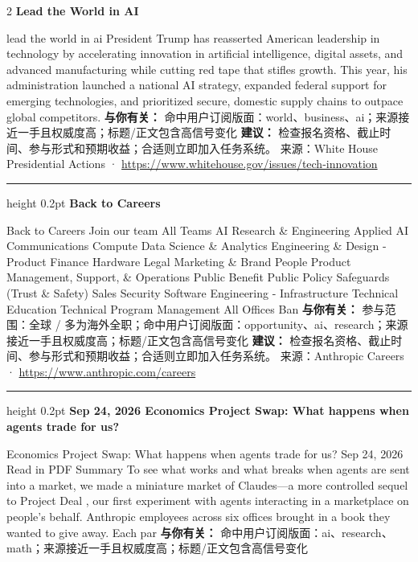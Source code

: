 \documentclass[10.5pt]{ctexart}
\begin{document}
\begin{multicols}{2}
{\large\bfseries Lead the World in AI}\par
lead the world in ai President Trump has reasserted American leadership in technology by accelerating innovation in artificial intelligence, digital assets, and advanced manufacturing while cutting red tape that stifles growth. This year, his administration launched a national AI strategy, expanded federal support for emerging technologies, and prioritized secure, domestic supply chains to outpace global competitors.
\textbf{与你有关：} 命中用户订阅版面：world、business、ai；来源接近一手且权威度高；标题/正文包含高信号变化
\textbf{建议：} 检查报名资格、截止时间、参与形式和预期收益；合适则立即加入任务系统。
{\footnotesize\color{ormuted} 来源：White House Presidential Actions · \url{https://www.whitehouse.gov/issues/tech-innovation}}
\vspace{2mm}
\hrule height 0.2pt
\vspace{2mm}
{\large\bfseries Back to Careers}\par
Back to Careers Join our team All Teams AI Research \& Engineering Applied AI Communications Compute Data Science \& Analytics Engineering \& Design - Product Finance Hardware Legal Marketing \& Brand People Product Management, Support, \& Operations Public Benefit Public Policy Safeguards (Trust \& Safety) Sales Security Software Engineering - Infrastructure Technical Education Technical Program Management All Offices Ban
\textbf{与你有关：} 参与范围：全球 / 多为海外全职；命中用户订阅版面：opportunity、ai、research；来源接近一手且权威度高；标题/正文包含高信号变化
\textbf{建议：} 检查报名资格、截止时间、参与形式和预期收益；合适则立即加入任务系统。
{\footnotesize\color{ormuted} 来源：Anthropic Careers · \url{https://www.anthropic.com/careers}}
\vspace{2mm}
\hrule height 0.2pt
\vspace{2mm}
{\large\bfseries Sep 24, 2026 Economics Project Swap: What happens when agents trade for us?}\par
Economics Project Swap: What happens when agents trade for us? Sep 24, 2026 Read in PDF Summary To see what works and what breaks when agents are sent into a market, we made a miniature market of Claudes—a more controlled sequel to Project Deal , our first experiment with agents interacting in a marketplace on people's behalf. Anthropic employees across six offices brought in a book they wanted to give away. Each par
\textbf{与你有关：} 命中用户订阅版面：ai、research、math；来源接近一手且权威度高；标题/正文包含高信号变化

\end{multicols}
\end{document}
